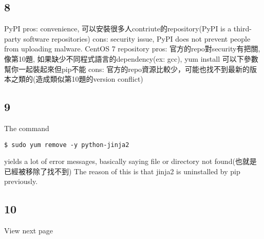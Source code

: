 \documentclass{article}
\begin{document}
    \subsection{8}
    PyPI \newline
    pros: convenience, 可以安裝很多人contriute的repository(PyPI is a third-party software repositories)\newline
    cons: security issue, PyPI does not prevent people from uploading malware.\newline\newline
    CentOS 7 repository\newline
    pros: 官方的repo對security有把關, 像第10題, 如果缺少不同程式語言的dependency(ex: gcc), yum install 可以下參數幫你一起裝起來但pip不能\newline
    cons: 官方的repo資源比較少，可能也找不到最新的版本之類的(造成類似第10題的version conflict)
    \subsection{9}
    The command
    \begin{verbatim}$ sudo yum remove -y python-jinja2\end{verbatim}
    yields a lot of error messages, basically saying file or directory not found(也就是已經被移除了找不到)\newline
    The reason of this is that jinja2 is uninstalled by pip previously.
    \subsection{10}
    View next page
\end{document}
